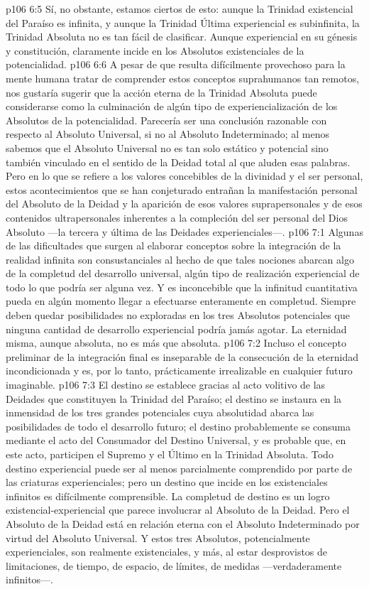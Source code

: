 \vs p106 6:5 Sí, no obstante, estamos ciertos de esto: aunque la Trinidad existencial del Paraíso es infinita, y aunque la Trinidad Última experiencial es subinfinita, la Trinidad Absoluta no es tan fácil de clasificar. Aunque experiencial en su génesis y constitución, claramente incide en los Absolutos existenciales de la potencialidad.
\vs p106 6:6 A pesar de que resulta difícilmente provechoso para la mente humana tratar de comprender estos conceptos suprahumanos tan remotos, nos gustaría sugerir que la acción eterna de la Trinidad Absoluta puede considerarse como la culminación de algún tipo de experiencialización de los Absolutos de la potencialidad. Parecería ser una conclusión razonable con respecto al Absoluto Universal, si no al Absoluto Indeterminado; al menos sabemos que el Absoluto Universal no es tan solo estático y potencial sino también vinculado en el sentido de la Deidad total al que aluden esas palabras. Pero en lo que se refiere a los valores concebibles de la divinidad y el ser personal, estos acontecimientos que se han conjeturado entrañan la manifestación personal del Absoluto de la Deidad y la aparición de esos valores suprapersonales y de esos contenidos ultrapersonales inherentes a la compleción del ser personal del Dios Absoluto ---la tercera y última de las Deidades experienciales---.
\vs p106 7:1 Algunas de las dificultades que surgen al elaborar conceptos sobre la integración de la realidad infinita son consustanciales al hecho de que tales nociones abarcan algo de la completud del desarrollo universal, algún tipo de realización experiencial de todo lo que podría ser alguna vez. Y es inconcebible que la infinitud cuantitativa pueda en algún momento llegar a efectuarse enteramente en completud. Siempre deben quedar posibilidades no exploradas en los tres Absolutos potenciales que ninguna cantidad de desarrollo experiencial podría jamás agotar. La eternidad misma, aunque absoluta, no es más que absoluta.
\vs p106 7:2 Incluso el concepto preliminar de la integración final es inseparable de la consecución de la eternidad incondicionada y es, por lo tanto, prácticamente irrealizable en cualquier futuro imaginable.
\vs p106 7:3 \pc El destino se establece gracias al acto volitivo de las Deidades que constituyen la Trinidad del Paraíso; el destino se instaura en la inmensidad de los tres grandes potenciales cuya absolutidad abarca las posibilidades de todo el desarrollo futuro; el destino probablemente se consuma mediante el acto del Consumador del Destino Universal, y es probable que, en este acto, participen el Supremo y el Último en la Trinidad Absoluta. Todo destino experiencial puede ser al menos parcialmente comprendido por parte de las criaturas experienciales; pero un destino que incide en los existenciales infinitos es difícilmente comprensible. La completud de destino es un logro existencial\hyp{}experiencial que parece involucrar al Absoluto de la Deidad. Pero el Absoluto de la Deidad está en relación eterna con el Absoluto Indeterminado por virtud del Absoluto Universal. Y estos tres Absolutos, potencialmente experienciales, son realmente existenciales, y más, al estar desprovistos de limitaciones, de tiempo, de espacio, de límites, de medidas ---verdaderamente infinitos---.
